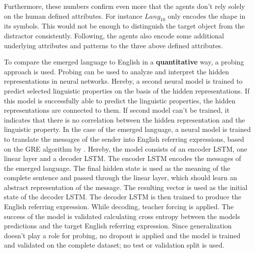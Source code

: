 Furthermore, these numbers confirm even more that the agents don't rely solely on the human defined attributes.
For instance $Lang_{10}$ only encodes the shape in its symbols.
This would not be enough to distinguish the target object from the distractor consistently.
Following, the agents also encode some additional underlying attributes and patterns to the three above defined attributes.

To compare the emerged language to English in a \textbf{quantitative} way, a probing approach is used.
Probing can be used to analyze and interpret the hidden representations in neural networks.
Hereby, a second neural model is trained to predict selected linguistic properties on the basis of the hidden representations.
If this model is successfully able to predict the linguistic properties, the hidden representations are connected to them.
If second model can't be trained, it indicates that there is no correlation between the hidden representation and the linguistic property.
In the case of the emerged language, a neural model is trained to translate the messages of the sender into English referring expressions, based on the GRE algorithm by \citet{Dale1995}.
Hereby, the model consists of an encoder LSTM, one linear layer and a decoder LSTM.
The encoder LSTM encodes the messages of the emerged language.
The final hidden state is used as the meaning of the complete sentence and passed through the linear layer, which should learn an abstract representation of the message.
The resulting vector is used as the initial state of the decoder LSTM.
The decoder LSTM is then trained to produce the English referring expression.
While decoding, teacher forcing is applied.
The success of the model is validated calculating cross entropy between the models predictions and the target English referring expression.
Since generalization doesn't play a role for probing, no dropout is applied and the model is trained and validated on the complete dataset; no test or validation split is used.

